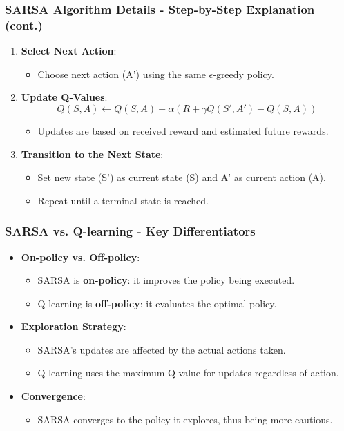 \documentclass[aspectratio=169]{beamer}
\begin{document}
\begin{frame}[fragile]
    \frametitle{SARSA Algorithm Details - Step-by-Step Explanation (cont.)}
    \begin{enumerate}[resume]
        \item \textbf{Select Next Action}:
            \begin{itemize}
                \item Choose next action (A') using the same $\epsilon$-greedy policy.
            \end{itemize}
        \item \textbf{Update Q-Values}:
            \begin{equation}
            Q(S, A) \leftarrow Q(S, A) + \alpha \left( R + \gamma Q(S', A') - Q(S, A) \right)
            \end{equation}
            \begin{itemize}
                \item Updates are based on received reward and estimated future rewards.
            \end{itemize}
        \item \textbf{Transition to the Next State}:
            \begin{itemize}
                \item Set new state (S') as current state (S) and A' as current action (A).
                \item Repeat until a terminal state is reached.
            \end{itemize}
    \end{enumerate}
\end{frame}

\begin{frame}[fragile]
    \frametitle{SARSA vs. Q-learning - Key Differentiators}
    \begin{itemize}
        \item \textbf{On-policy vs. Off-policy}:
            \begin{itemize}
                \item SARSA is \textbf{on-policy}: it improves the policy being executed.
                \item Q-learning is \textbf{off-policy}: it evaluates the optimal policy.
            \end{itemize}
        \item \textbf{Exploration Strategy}:
            \begin{itemize}
                \item SARSA's updates are affected by the actual actions taken.
                \item Q-learning uses the maximum Q-value for updates regardless of action.
            \end{itemize}
        \item \textbf{Convergence}:
            \begin{itemize}
                \item SARSA converges to the policy it explores, thus being more cautious.
            \end{itemize}
    \end{itemize}
\end{frame}
\end{document}

